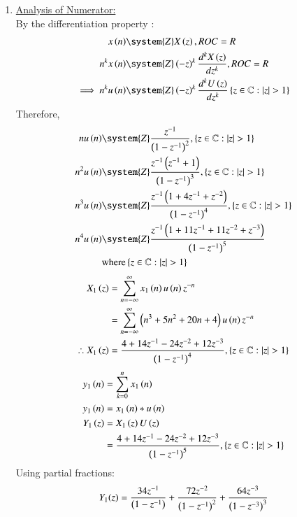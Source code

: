 \documentclass[journal,12pt,twocolumn]{IEEEtran}
\theoremstyle{remark}
\begin{document}
\begin{enumerate}[label=\arabic*.]
\item \underline {Analysis of Numerator:}\\


By the differentiation property :
\begin{align}
x\brak{n} &\system{Z} X\brak{z}, ROC = R\\
n^k x\brak{n} &\system{Z} \brak{-z}^k \frac{d^kX\brak{z}}{dz^k}, ROC = R \\
\implies n^k u\brak{n} & \system{Z} \brak{-z}^k \frac{d^kU\brak{z}}{dz^k} \cbrak{z\in\mathbb{C} : \lvert z \rvert > 1}
\end{align}
Therefore,
\begin{align}
    n u\brak{n} & \system{Z} \frac{z^{-1}}{\brak{1-z^{-1}}^2} ,\cbrak{z\in\mathbb{C} : \lvert z \rvert > 1} \\
     n^2 u\brak{n} & \system{Z} \frac{z^{-1}\brak{z^{-1}+1}}{\brak{1-z^{-1}}^3} ,\cbrak{z\in\mathbb{C} : \lvert z \rvert > 1} \\
     n^3 u\brak{n} & \system{Z} \frac{z^{-1}\brak{1+4z^{-1}+z^{-2}}}{\brak{1-z^{-1}}^4} ,\cbrak{z\in\mathbb{C} : \lvert z \rvert > 1} \\
    n^4 u\brak{n} & \system{Z} \frac{z^{-1}\brak{1+11z^{-1}+11z^{-2}+z^{-3}}}{\brak{1-z^{-1}}^5}\\ &  \text{where} \cbrak{z\in\mathbb{C} :\lvert z \rvert > 1} \notag 
\end{align}
\begin{align}
 X_1\left(z\right) &= \sum_{n=-\infty}^\infty x_1\left(n\right) u\left(n\right) z^{-n}\\
             &= \sum_{n=-\infty}^\infty \left(n^{3} + 5n^{2} + 20n + 4\right) u\left(n\right) z^{-n}\\
 \therefore   X_1\left(z\right)&= \frac{4+14z^{-1}-24z^{-2}+12z^{-3}}{\left(1-z^{-1}\right)^4} ,\left\{z\in\mathbb{C} : \lvert z \rvert > 1\right\} 
\end{align}
\begin{align}
y_1\left(n\right) &= \sum_{k=0}^n x_1\left(n\right) \\
y_1\left(n\right) &= x_1\left(n\right)\ast u\left(n\right)\\
    Y_1\left(z\right) &= X_1\left(z\right) U\left(z\right) \\
 &= \frac{4+14z^{-1}-24z^{-2}+12z^{-3}}{\left(1-z^{-1}\right)^5} ,\left\{z\in\mathbb{C} : \lvert z \rvert > 1\right\} 
\end{align}
Using partial fractions:
\begin{align}
    Y_1(z) &= \frac{34z^{-1}}{\brak{1-z^{-1}}} + \frac{72z^{-2}}{\brak{1-z^{-1}}^2} + \frac{64z^{-3}}{\brak{1-z^{-3}}^3} \label{eq:partial1}\\

\end{align}
\end{enumerate}
\end{document}
